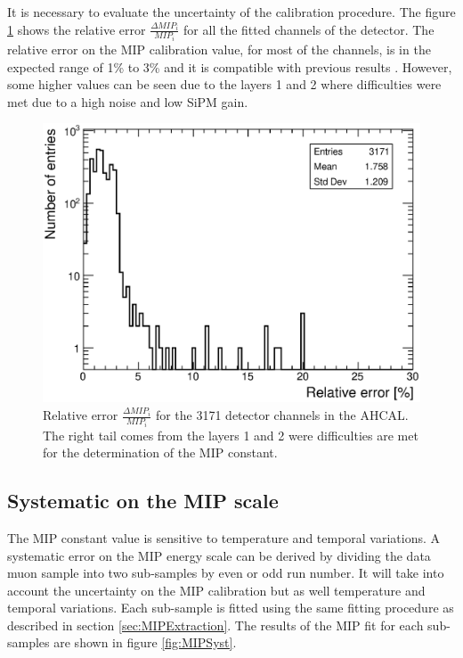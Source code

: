 It is necessary to evaluate the uncertainty of the calibration procedure. The figure \ref{fig:MIPError} shows the relative error $\frac{\Delta MIP_i}{MIP_i}$ for all the fitted channels of the detector. The relative error on the MIP calibration value, for most of the channels, is in the expected range of 1\% to 3\% and it is compatible with previous results \cite{SarahMaster}. However, some higher values can be seen due to the layers 1 and 2 where difficulties were met due to a high noise and low SiPM gain.

\begin{figure}[htbp!]
	\centering
	\includegraphics[width=0.6\linewidth]{../Thesis_Plots/EnergyCalib/Plots/RelativeErrorMIP_Combined.eps}
	\caption{Relative error $\frac{\Delta MIP_i}{MIP_i}$ for the 3171 detector channels in the AHCAL. The right tail comes from the layers 1 and 2 were difficulties are met for the determination of the MIP constant.} \label{fig:MIPError}
\end{figure}

\subsection{Systematic on the MIP scale}

The MIP constant value is sensitive to temperature and temporal variations. A systematic error on the MIP energy scale can be derived by dividing the data muon sample into two sub-samples by even or odd run number. It will take into account the uncertainty on the MIP calibration but as well temperature and temporal variations. Each sub-sample is fitted using the same fitting procedure as described in section \ref{sec:MIPExtraction}. The results of the MIP fit for each sub-samples are shown in figure \ref{fig:MIPSyst}.

